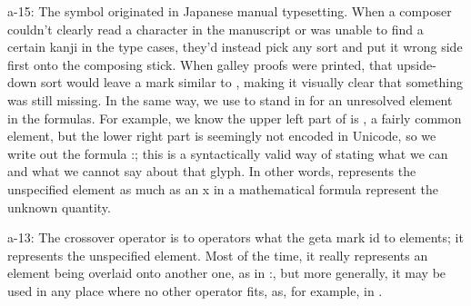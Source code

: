 \begin{multicols}{2}
{\mktsStyleBold{}a-15}: The symbol \cjkgGlue{} originated in Japanese manual typesetting. When a composer
couldn’t clearly read a character in the manuscript or was unable to find
a certain kanji in the type cases, they’d instead pick any sort and
put it wrong side first onto the composing stick. When galley proofs were
printed, that upside-down sort would leave a mark similar to \cjkgGlue{}, making it
visually clear that something was still missing. In the same way, we
use \cjkgGlue{} to stand in for an unresolved element in the formulas. For
example, we know the upper left part of \cjkgGlue{} is \cjkgGlue{}, a fairly common element,
but the lower right part is seemingly not encoded in Unicode, so we write
out the formula \cjkgGlue{}:\cjkgGlue{}\cjkgGlue{}; this is a syntactically valid way of stating what
we can and what we cannot say about that glyph. In other words,
\cjkgGlue{} represents the unspecified element as much as an {\mktsStyleItalic{}x\/} in a mathematical
formula represent the unknown quantity.

{\mktsStyleBold{}a-13}: The crossover operator \cjkgGlue{} is to operators what the geta mark
\cjkgGlue{} id to elements; it represents the unspecified element. Most of
the time, it really represents an element being overlaid onto another
one, as in \cjkgGlue{}:\cjkgGlue{}\cjkgGlue{}, but more generally, it may be used in any place
where no other operator fits, as, for example, in \cjkgGlue{}.

\end{multicols}



